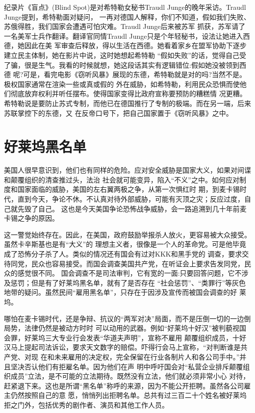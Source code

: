 \documentclass[10pt]{article}
\begin{document}
{纪录片《盲点》(Blind Spot)是对希特勒女秘书Traudl Junge的晚年采访。Traudl Junge提到，希特勒面对疑问，
一再对德国人解释，你们不知道，假如我们失败、苏俄得胜，我们国家会遭遇可怕灾难。Traudl Junge后来被苏军
抓获，苏军请了一名美军士兵作翻译。翻译官同情Traudl Junge只是个年轻秘书，设法让她进入西德，她因此在美
军审查后释放，得以生活在西德。她看着家乡在盟军协助下逐步建立民主体制，她在影片中说，这时她想起希特勒
``假如失败''的话，觉得自己受了骗，很是生气。我看的时候就想，她这段话其实有逻辑错位:假如她没被领到西德
呢?可是，看完电影《窃听风暴》展现的东德，希特勒就是对的吗?当然不是。极权国家通常在渲染一些或真或假的
外在威胁，如希特勒，利用民众恐惧而使他们彻底放弃权利并听任摆布。使得国家变得比政府宣称要预防的糟糕情
况更糟。希特勒说是要防止苏式专制，而他已在德国推行了专制的极端。而在另一端，后来苏联掌控下的东德，又
在反帝口号下，把自己国家置于《窃听风暴》之中。

\pagebreak
\section{好莱坞黑名单}

美国人很早意识到，他们也有同样的危险。应对安全威胁是国家大义，如果对间谍和颠覆组织的清查推过头，法治
社会就可能变异，陷入``不义''之中。如何应对制度和国家面临的威胁，美国的左右翼两极之争，从第一次惧红时
期，到麦卡锡时代，直到今天，争论不休。不认真对待外部威胁，可能有灭顶之灾；反应过度，自己就先毁了自己。
这也是今天美国争论恐怖战争威胁，会一路追溯到几十年前麦卡锡之争的原因。

这一警觉始终存在。因此，在美国，政府鼓励举报杀人放火，更容易被大众接受。虽然卡辛斯基也是有``大义''的
理想主义者，很像是一个人的革命党。可是他毕竟成了恐怖分子杀了人。类似的情况还有国会有过对KKK和黑手党的
调查，要求交待同党，民众也容易接受。而国会调查美国共产党，在听证会上要求告发同党，民众的感觉很不同。
国会调查不是司法审判，它有宽的一面:只要回答问题，它不涉及惩罚；但是有了好莱坞黑名单，就有了是否存在
``社会惩罚''、``类罪行''等灰色地带的疑问。虽然民间``雇用黑名单''，只存在于因涉及宣传而被国会调查的好
莱坞。

哪怕在麦卡锡时代，还是争辩、抗议的``两军对决''局面，而不是压倒一切的一边倒局势，法律仍然是被动方时时
可以动用的武器。例如``好莱坞十好汉''被判藐视国会罪，好莱坞三大专业行会发表``华道夫声明''，宣称不雇用
颠覆组织成员，十好汉马上提起司法诉讼，要求天文数字的赔偿。吓得行会马上宣称，``对判断谁是共产党、对现
在和未来雇用的决定权，完全保留在行业各制片人和各公司手中。''并且坚决否认他们有拒雇名单。因为他们在声
明中呼吁国会对``私营企业排斥颠覆组织成员''立法，是不可能的立法期待。既然没有立法，他们就必须非常小心
对待，赶紧退下来。这也是所谓``黑名单''称呼的来源，因为不能公开拒聘。虽然各公司雇主仍然按照自己的意
愿，悄悄列出拒聘名单。总共有过三百二十个姓名被好莱坞拒之门外，包括优秀的剧作者、演员和其他工作人员。

}
\end{document}
